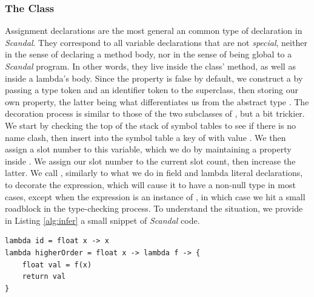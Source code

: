 \subsubsection{The  Class}

Assignment declarations are the most general an common type of declaration in \emph{Scandal}. They correspond to all variable declarations that are not \emph{special}, neither in the sense of declaring a method body, nor in the sense of being global to a \emph{Scandal} program. In other words, they live inside the  class'  method, as well as inside a lambda's body. Since the  property is false by default, we construct a  by passing a type token and an identifier token to the superclass, then storing our own  property, the latter being what differentiates us from the abstract type . The decoration process is similar to those of the two subclasses of , but a bit trickier. We start by checking the top of the stack of symbol tables to see if there is no name clash, then insert into the symbol table a key of  with value . We then assign a slot number to this variable, which we do by maintaining a property  inside . We assign our slot number to the current slot count, then increase the latter. We call , similarly to what we do in field and lambda literal declarations, to decorate the expression, which will cause it to have a non-null type in most cases, except when the expression is an instance of , in which case we hit a small roadblock in the type-checking process. To understand the situation, we provide in Listing \ref{alg:infer} a small snippet of \emph{Scandal} code.

\begin{lstlisting}[emph={lambda,float,return},emphstyle={\textbf},caption={Type inference in \emph{Scandal}.},label={alg:infer}]
lambda id = float x -> x
lambda higherOrder = float x -> lambda f -> {
	float val = f(x)
	return val
}
\end{lstlisting}

